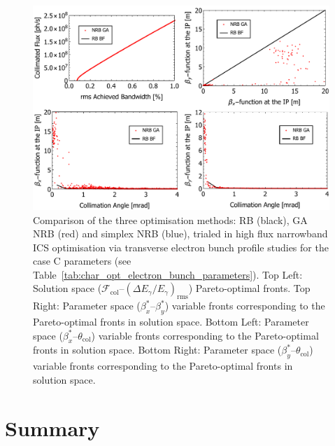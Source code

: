 \documentclass[../main.tex]{subfiles}
\begin{document}
\begin{figure}[!h]
\centering
\includegraphics[width=\textwidth]{Figures/Optimisation_and_Characterisation_of_Inverse_Compton_Scattering_Sources/CaseCoptcomp.pdf}
\caption{Comparison of the three optimisation methods: RB (black), GA NRB (red) and simplex NRB (blue), trialed in high flux narrowband ICS optimisation via transverse electron bunch profile studies for the case C parameters (see Table~\ref{tab:char_opt_electron_bunch_parameters}). Top Left: Solution space ($\mathcal{F}_{\mathrm{col}}$--$\left(\Delta E_{\gamma}/E_{\gamma}\right)_{\mathrm{rms}}$) Pareto-optimal fronts. Top Right: Parameter space ($\beta_{x}^{*}$--$\beta_{y}^{*}$) variable fronts corresponding to the Pareto-optimal fronts in solution space. Bottom Left: Parameter space ($\beta_{x}^{*}$--$\theta_{\mathrm{col}}$) variable fronts corresponding to the Pareto-optimal fronts in solution space. Bottom Right: Parameter space ($\beta_{y}^{*}$--$\theta_{\mathrm{col}}$) variable fronts corresponding to the Pareto-optimal fronts in solution space.}
\label{fig:case_C_optimisation_comparision}
\end{figure}

\section{Summary}
\end{document}
